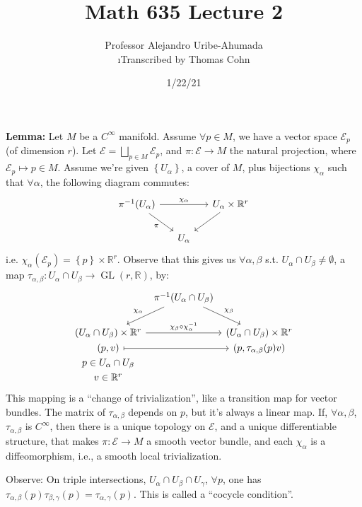 \documentclass[10pt,letterpaper]{article}
\author{Professor Alejandro Uribe-Ahumada\\ \small\i{Transcribed by Thomas Cohn}}
\title{Math 635 Lecture 2}
\date{1/22/21} %
\newcommand{\n}{\hfill\break}
\newcommand{\nn}{\vspace{0.5\baselineskip}\n}
\newcommand{\hangblock}[2]{\par\noindent\settowidth{\hangindent}{\textbf{#1: }}\textbf{#1: }\nolinebreak#2}
\newcommand{\lemma}[1]{\hangblock{Lemma}{#1}}
\newcommand{\set}[1]{\left\{#1\right\}}
\newcommand{\reals}{\mathbb{R}}
\newcommand{\R}{\reals}
\newcommand{\inv}{^{-1}}
\newcommand{\of}{\circ}
\DeclareMathOperator{\GL}{GL}
\newcommand{\st}{s.t.}
\begin{document}
\maketitle
\setlength\RaggedRightParindent{\parindent}
\RaggedRight

\lemma{
	Let $M$ be a $C^{\infty}$ manifold. Assume $\forall{}p\in{}M$, we have a vector space $\mathcal{E}_{p}$ (of dimension $r$). Let $\mathcal{E}=\bigsqcup_{p\in{}M}\mathcal{E}_{p}$, and $\pi:\mathcal{E}\to{}M$ the natural projection, where $\mathcal{E}_{p}\mapsto{}p\in{}M$. Assume we're given $\set{U_{\alpha}}$, a cover of $M$, plus bijections $\chi_{\alpha}$ such that $\forall\alpha$, the following diagram commutes:
	\[
		\begin{tikzcd}[ampersand replacement=\&]
			\pi\inv(U_{\alpha}) \arrow[rr,"\chi_{\alpha}"] \arrow[dr, "\pi", swap] \&[-10pt] \&[-10pt] U_{\alpha}\times\R^{r} \arrow[dl]\\
			\& U_{\alpha}
		\end{tikzcd}
	\]
	i.e. $\chi_{\alpha}(\mathcal{E}_{p})=\set{p}\times\R^{r}$.\nn
	Observe that this gives us $\forall\alpha,\beta$ \st{} $U_{\alpha}\cap{}U_{\beta}\ne\emptyset$, a map $\tau_{\alpha,\beta}:U_{\alpha}\cap{}U_{\beta}\to\GL(r,\R)$, by:
	\[
		\begin{tikzcd}[ampersand replacement=\&]
			\&[-20pt] \pi\inv(U_{\alpha}\cap{}U_{\beta}) \arrow[dl, "\chi_{\alpha}", swap] \arrow[dr, "\chi_{\beta}"] \&[-20pt]\\
			(U_{\alpha}\cap{}U_{\beta})\times\R^{r} \arrow[rr,"\chi_{\beta}\of\chi_{\alpha}\inv"] \& \& (U_{\alpha}\cap{}U_{\beta})\times\R^{r}\\[-20pt]
			(p,v) \arrow[rr,mapsto] \& \& (p,\tau_{\alpha,\beta}(p)v)\\[-20pt]
			p\in{}U_{\alpha}\cap{}U_{\beta}\\[-20pt]
			v\in\R^{r}
		\end{tikzcd}
	\]
	This mapping is a ``change of trivialization'', like a transition map for vector bundles. The matrix of $\tau_{\alpha,\beta}$ depends on $p$, but it's always a linear map.\nn
	If, $\forall\alpha,\beta$, $\tau_{\alpha,\beta}$ is $C^{\infty}$, then there is a unique topology on $\mathcal{E}$, and a unique differentiable structure, that makes $\pi:\mathcal{E}\to{}M$ a smooth vector bundle, and each $\chi_{\alpha}$ is a diffeomorphism, i.e., a smooth local trivialization.\n
}

\par\noindent
Observe: On triple intersections, $U_{\alpha}\cap{}U_{\beta}\cap{}U_{\gamma}$, $\forall{}p$, one has $\tau_{\alpha,\beta}(p)\tau_{\beta,\gamma}(p)=\tau_{\alpha,\gamma}(p)$. This is called a ``cocycle condition''.\n
\end{document}

